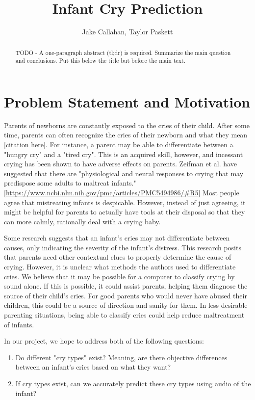 \documentclass[11pt]{article}
\title{Infant Cry Prediction}
\author{Jake Callahan, Taylor Paskett}
\begin{document}
\maketitle

\begin{abstract}
   TODO - A one-paragraph abstract (tl;dr) is required. Summarize the main question and conclusions. Put this below the title but before the main text.
\end{abstract}

\section{Problem Statement and Motivation}
Parents of newborns are constantly exposed to the cries of their child.
After some time, parents can often recognize the cries of their newborn and what they mean [citation here].
For instance, a parent may be able to differentiate between a "hungry cry" and a "tired cry".
This is an acquired skill, however, and incessant crying has been shown to have adverse effects on parents.
Zeifman et al. have suggested that there are "physiological and neural responses to crying that may predispose some adults to maltreat infants." [\url{https://www.ncbi.nlm.nih.gov/pmc/articles/PMC5494986/#R5}]
Most people agree that mistreating infants is despicable.
However, instead of just agreeing, it might be helpful for parents to actually have tools at their disposal so that they can more calmly, rationally deal with a crying baby.

Some research suggests that an infant's cries may not differentiate between causes, only indicating the severity of the infant's distress.
This research posits that parents need other contextual clues to properly determine the cause of crying.
However, it is unclear what methods the authors used to differentiate cries.
We believe that it may be possible for a computer to classify crying by sound alone.
If this is possible, it could assist parents, helping them diagnose the source of their child's cries.
For good parents who would never have abused their children, this could be a source of direction and sanity for them.
In less desirable parenting situations, being able to classify cries could help reduce maltreatment of infants.

In our project, we hope to address both of the following questions:
\begin{enumerate}
   \item Do different "cry types" exist? Meaning, are there objective differences between an infant's cries based on what they want?
   \item If cry types exist, can we accurately predict these cry types using audio of the infant?
\end{enumerate}
\end{document}
